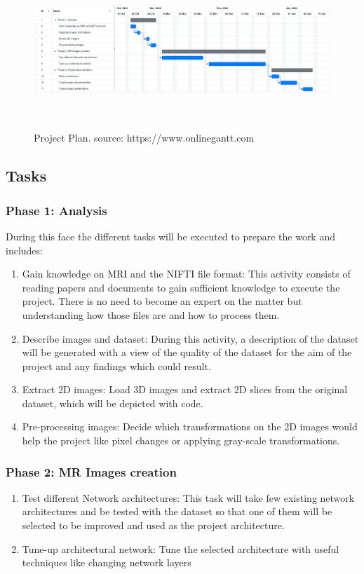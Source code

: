 \begin{figure}[ht]
    \hspace*{-1.2in}
    \centering
    \includegraphics[width = 20cm, height = 6cm]{images/project-plan.png}
    \caption[]{Project Plan. source: https://www.onlinegantt.com}
    \label{fig:project-plan}
\end{figure}

\newpage
\subsection{Tasks}
\subsubsection*{Phase 1: Analysis}

During this face the different tasks will be executed to prepare the work and includes:
\begin{enumerate}
    \item Gain knowledge on MRI and the NIFTI file format: This activity consists of reading papers and documents to gain sufficient knowledge to execute the project. There is no need to become an expert on the matter but understanding how those files are and how to process them.
    \item Describe images and dataset: During this activity, a description of the dataset will be generated with a view of the quality of the dataset for the aim of the project and any findings which could result.
    \item Extract 2D images: Load 3D images and extract 2D slices from the original dataset, which will be depicted with code.
    \item Pre-processing images: Decide which transformations on the 2D images would help the project like pixel changes or applying gray-scale transformations.
\end{enumerate}

\subsubsection*{Phase 2: MR Images creation}

\begin{enumerate}
    \item Test different Network architectures: This task will take few existing network architectures and be tested with the dataset so that one of them will be selected to be improved and used as the project architecture.
    \item Tune-up architectural network: Tune the selected architecture with useful techniques like changing network layers
\end{enumerate}